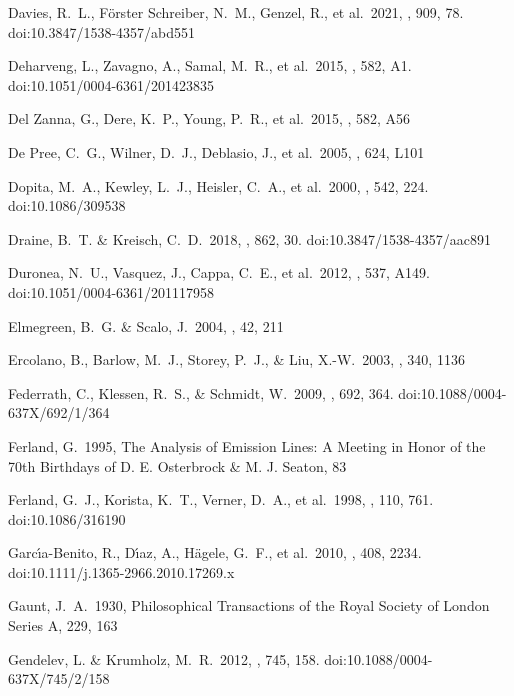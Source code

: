 \documentclass[twocolumn]{aastex62}
\begin{document}
\begin{CJK*}{UTF8}{gbsn}
\begin{thebibliography}{}
 Davies, R.~L., F{\"o}rster Schreiber, N.~M., Genzel, R., et al.\ 2021, \apj, 909, 78. doi:10.3847/1538-4357/abd551

 Deharveng, L., Zavagno, A., Samal, M.~R., et al.\ 2015, \aap, 582, A1. doi:10.1051/0004-6361/201423835

 Del Zanna, G., Dere, K.~P., Young, P.~R., et al.\ 2015, \aap, 582, A56

 De Pree, C.~G., Wilner, D.~J., Deblasio, J., et al.\ 2005, \apjl, 624, L101

 Dopita, M.~A., Kewley, L.~J., Heisler, C.~A., et al.\ 2000, \apj, 542, 224. doi:10.1086/309538

 Draine, B.~T. \& Kreisch, C.~D.\ 2018, \apj, 862, 30. doi:10.3847/1538-4357/aac891

 Duronea, N.~U., Vasquez, J., Cappa, C.~E., et al.\ 2012, \aap, 537, A149. doi:10.1051/0004-6361/201117958

 Elmegreen, B.~G. \& Scalo, J.\ 2004, \araa, 42, 211

 Ercolano, B., Barlow, M.~J., Storey, P.~J., \& Liu, X.-W.\ 2003, \mnras, 340, 1136 

 Federrath, C., Klessen, R.~S., \& Schmidt, W.\ 2009, \apj, 692, 364. doi:10.1088/0004-637X/692/1/364

 Ferland, G.\ 1995, The Analysis of Emission Lines: A Meeting in Honor of the 70th Birthdays of D. E. Osterbrock \& M. J. Seaton, 83

 Ferland, G.~J., Korista, K.~T., Verner, D.~A., et al.\ 1998, \pasp, 110, 761. doi:10.1086/316190

 Garc{\'\i}a-Benito, R., D{\'\i}az, A., H{\"a}gele, G.~F., et al.\ 2010, \mnras, 408, 2234. doi:10.1111/j.1365-2966.2010.17269.x

 Gaunt, J.~A.\ 1930, Philosophical Transactions of the Royal Society of London Series A, 229, 163

 Gendelev, L. \& Krumholz, M.~R.\ 2012, \apj, 745, 158. doi:10.1088/0004-637X/745/2/158


\end{thebibliography}
\end{CJK*}
\end{document}

